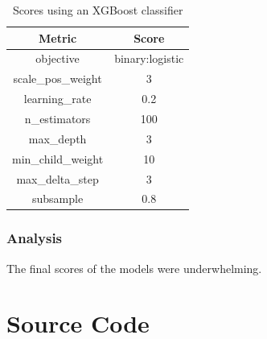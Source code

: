 \documentclass[11pt]{article}
\begin{document}
\begin{table}[!ht]
    \caption{Scores using an XGBoost classifier}
    \label{table:gs2_score}
    \begin{center}

        \begin{tabular}{| c | c |}
        \hline
        \textbf{Metric} & \textbf{Score}
        \\ \hline
        objective & binary:logistic
        \\ \hline
        scale\_pos\_weight & 3
        \\ \hline
        learning\_rate & 0.2
        \\ \hline
        n\_estimators & 100
        \\ \hline
        max\_depth & 3
        \\ \hline
        min\_child\_weight & 10
        \\ \hline
        max\_delta\_step & 3
        \\ \hline
        subsample & 0.8
        \\ \hline
        \end{tabular}

    \end{center}

\end{table}



\subsubsection{Analysis}
The final scores of the models were underwhelming.




\appendix
{}%

\section{Source Code} \label{appendix:src}


\end{document}
